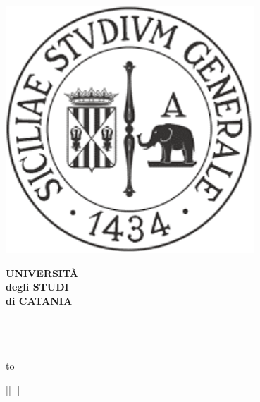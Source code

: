 \begin{titlepage}
\begin{center}
\begin{minipage}[]{0.4\textwidth}%
\includegraphics[width=0.7\textwidth]{figures/logo_unict.png}%
\end{minipage}%
\begin{minipage}[]{0.45\textwidth}%
\huge\textbf{UNIVERSIT\`A\\degli STUDI\\di CATANIA}\par%
\end{minipage}\\
\vspace{0.8cm}
{\large\checkempty{\dipartimento}}\\
\vspace{0.25cm}
{\large\textbf{\corsoDiLaurea}}\\
\hbox to \textwidth{\hrulefill}
\vspace{\spazioSopraTitolo}
\textbf{\huge\titolo}\\
\vspace{\spazioSottoTitolo}
\begin{minipage}{\textwidth}
\begin{flushright}
\begin{minipage}{0.3\textwidth}
{\large\begin{tabbing}%
\StrLen{\candidato}[\candidatoLen]%
%
\StrLen{\relatore}[\relatoreLen]%
%

\end{tabbing}}
\end{minipage}
\end{flushright}
\end{minipage}
\end{center}
\end{titlepage}
